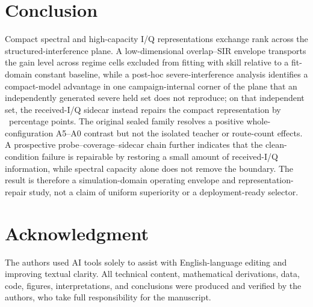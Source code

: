 \documentclass[letterpaper,journal]{IEEEtran}
\newcommand{\pp}{percentage points}
\begin{document}
\section{Conclusion}
Compact spectral and high-capacity I/Q representations exchange rank across
the structured-interference plane. A low-dimensional overlap--SIR envelope
transports the gain level across regime cells excluded from fitting with
skill relative to a fit-domain constant baseline, while a post-hoc
severe-interference analysis identifies a compact-model advantage in one
campaign-internal corner of the plane that an independently generated severe
held set does not reproduce; on that independent set, the received-I/Q
sidecar instead repairs the compact representation by \SevereRepairDiff\ \pp. The original
sealed family resolves a positive whole-configuration A5--A0 contrast but not
the isolated teacher or route-count effects. A prospective
probe--coverage--sidecar chain further indicates that the clean-condition
failure is repairable by restoring a small amount of received-I/Q information,
while spectral capacity alone does not remove the boundary. The result is
therefore a simulation-domain operating envelope and representation-repair
study, not a claim of uniform superiority or a deployment-ready selector.

\section*{Acknowledgment}
The authors used AI tools solely to assist with English-language editing and
improving textual clarity. All technical content, mathematical derivations,
data, code, figures, interpretations, and conclusions were produced and
verified by the authors, who take full responsibility for the manuscript.



\end{document}
